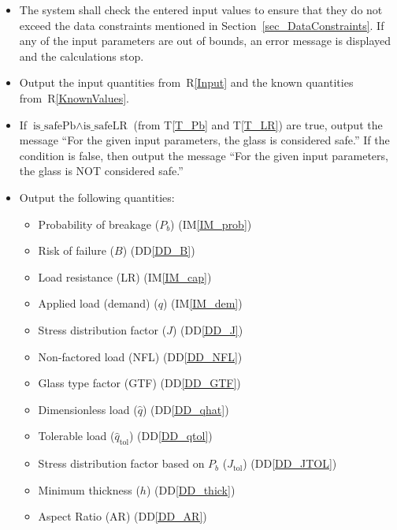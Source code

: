 \documentclass[12pt]{article}
\newcommand{\ddref}[1]{DD\ref{#1}}
\newcommand{\tref}[1]{T\ref{#1}}
\newcommand{\iref}[1]{IM\ref{#1}}
\newcounter{reqnum} %
\newcommand{\rref}[1]{R\ref{#1}}
\begin{document}
\begin{itemize}
\item[R\refstepcounter{reqnum}\thereqnum \label{Verify}:]

  The system shall check the entered input values to ensure that they do not
  exceed the data constraints mentioned in Section~\ref{sec_DataConstraints}.  If any of
  the input parameters are out of bounds, an error message is displayed and the
  calculations stop.

\item[R\refstepcounter{reqnum}\thereqnum \label{R_OutputInput}:]

  Output the input quantities from~\rref{Input} and the known quantities
  from~\rref{KnownValues}.

\item[R\refstepcounter{reqnum}\thereqnum \label{R_ Comparison}:] If
  $\text{is\_safePb} \wedge \text{is\_safeLR}$ (from \tref{T_Pb} and \tref{T_LR}) are true,
  output the message ``For the given input parameters, the glass is considered
  safe.''  If the condition is false, then output the message ``For the given
  input parameters, the glass is NOT considered safe.''

\item[R\refstepcounter{reqnum}\thereqnum \label{R_Output}:]
  Output the following quantities:
\begin{itemize}
\item Probability of breakage ($P_b$) (\iref{IM_prob})
\item Risk of failure ($B$) (\ddref{DD_B})
\item Load resistance (LR) (\iref{IM_cap})
\item Applied load (demand) ($q$) (\iref{IM_dem})
\item Stress distribution factor ($J$) (\ddref{DD_J})
\item Non-factored load (NFL) (\ddref{DD_NFL})
\item Glass type factor (GTF) (\ddref{DD_GTF})
\item Dimensionless load ($\hat{q}$) (\ddref{DD_qhat})
\item Tolerable load ($\hat{q}_{\text{tol}}$) (\ddref{DD_qtol})
\item Stress distribution factor based on $P_b$ ($J_{\text{tol}}$) (\ddref{DD_JTOL})
\item Minimum thickness ($h$) (\ddref{DD_thick})
\item Aspect Ratio (AR) (\ddref{DD_AR})
\end{itemize}



\end{itemize}
\end{document}
